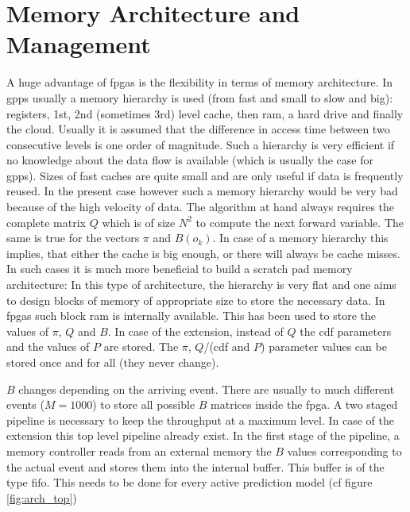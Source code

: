 \documentclass[mscthesis]{usiinfthesis}
\begin{document}
\section{Memory Architecture and Management}
\label{ch:design_mem}

A huge advantage of \glspl{fpga} is the flexibility in terms of memory
architecture. In \glspl{gpp} usually a memory hierarchy is used (from fast and
small to slow and big): registers, 1st, 2nd (sometimes 3rd) level cache, then
\gls{ram}, a hard drive and finally the cloud. Usually it is assumed that the
difference in access time between two consecutive levels is one order of
magnitude. Such a hierarchy is very efficient if no knowledge about the data
flow is available (which is usually the case for \glspl{gpp}). Sizes of fast
caches are quite small and are only useful if data is frequently reused. In the
present case however such a memory hierarchy would be very bad because of the
high velocity of data. The algorithm at hand always requires the complete
matrix $Q$ which is of size $N^2$ to compute the next forward variable. The
same is true for the vectors $\pi$ and $B(o_k)$. In case of a memory hierarchy
this implies, that either the cache is big enough, or there will always be
cache misses. In such cases it is much more beneficial to build a scratch pad
memory architecture: In this type of architecture, the hierarchy is very flat
and one aims to design blocks of memory of appropriate size to store the
necessary data. In \glspl{fpga} such block ram is internally available. This
has been used to store the values of $\pi$, $Q$ and $B$. In case of the
extension, instead of $Q$ the \gls{cdf} parameters and the values of $P$ are
stored. The $\pi$, $Q$/(\gls{cdf} and $P$) parameter values can be stored once
and for all (they never change).

$B$ changes depending on the arriving event. There are usually to much
different events ($M=1000$) to store all possible $B$ matrices inside the
\gls{fpga}. A two staged pipeline is necessary to keep the throughput at
a maximum level. In case of the extension this top level pipeline already
exist. In the first stage of the pipeline, a memory controller reads from an
external memory the $B$ values corresponding to the actual event and stores
them into the internal buffer. This buffer is of the type \gls{fifo}. This
needs to be done for every active prediction model (cf figure
\ref{fig:arch_top})
\end{document}
